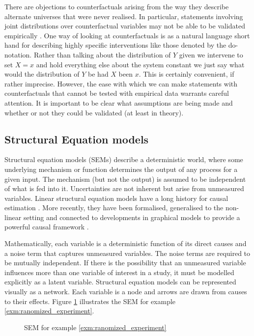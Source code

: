 \documentclass[11pt,a4paper,twoside]{report}
\theoremstyle{plain}
\theoremstyle{definition}
\let\epsilon\varepsilon
\begin{document}
There are objections to counterfactuals arising from the way they describe alternate universes that were never realised. In particular, statements involving joint distributions over counterfactual variables may not be able to be validated empirically \citet{Dawid2000}. One way of looking at counterfactuals is as a natural language short hand for describing highly specific interventions like those denoted by the do-notation. Rather than talking about the distribution of $Y$ given we intervene to set $X=x$ and hold everything else about the system constant we just say what would the distribution of $Y$ be had $X$ been $x$. This is certainly convenient, if rather imprecise. However, the ease with which we can make statements with counterfactuals that cannot be tested with empirical data warrants careful attention. It is important to be clear what assumptions are being made and whether or not they could be validated (at least in theory). 

\subsection{Structural Equation models}
\label{sec:SEM}

Structural equation models (SEMs) describe a deterministic world, where some underlying mechanism or function determines the output of any process for a given input. The mechanism (but not the output) is assumed to be independent of what is fed into it. Uncertainties are not inherent but arise from unmeasured variables. Linear structural equation models have a long history for causal estimation \cite {Wright1921,Haavelmo1943}. More recently, they have been formalised, generalised to the non-linear setting and connected to developments in graphical models to provide a powerful causal framework \citep{Pearl2000}.

Mathematically, each variable is a deterministic function of its direct causes and a noise term that captures unmeasured variables. The noise terms are required to be mutually independent. If there is the possibility that an unmeasured variable influences more than one variable of interest in a study, it must be modelled explicitly as a latent variable. Structural equation models can be represented visually as a network. Each variable is a node and arrows are drawn from causes to their effects. Figure \ref{fig:sem_randomized_treatment} illustrates the SEM for example \ref{exm:ranomized_experiment}.

\begin{figure}[ht]
\centering
{}
\caption{SEM for example \ref{exm:ranomized_experiment}}
\label{fig:sem_randomized_treatment}
\end{figure}
\end{document}
